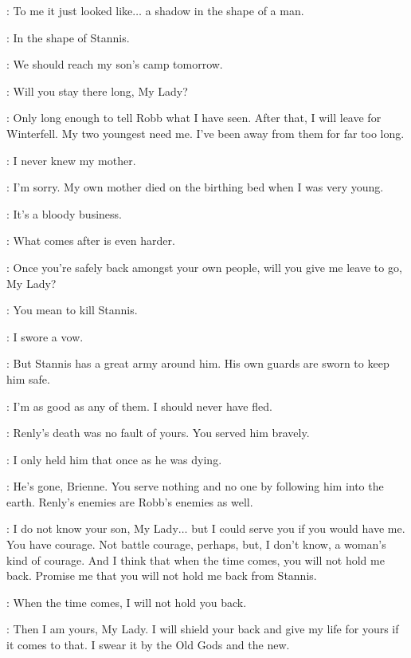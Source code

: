 \CATELYN: To me it just looked like$\ldots$ a shadow in the shape of a man. 

\BRIENNE: In the shape of Stannis. 

\CATELYN: We should reach my son's camp tomorrow. 

\BRIENNE: Will you stay there long, My Lady? 

\CATELYN: Only long enough to tell Robb what I have seen. After that, I will leave for Winterfell. My two youngest need me. I've been away from them for far too long. 

\BRIENNE: I never knew my mother. 

\CATELYN: I'm sorry. My own mother died on the birthing bed when I was very young. 

\BRIENNE: It's a bloody business. 

\CATELYN: What comes after is even harder. 

\BRIENNE: Once you're safely back amongst your own people, will you give me leave to go, My Lady? 

\CATELYN: You mean to kill Stannis. 

\BRIENNE: I swore a vow. 

\CATELYN: But Stannis has a great army around him. His own guards are sworn to keep him safe. 

\BRIENNE: I'm as good as any of them. I should never have fled. 

\CATELYN: Renly's death was no fault of yours. You served him bravely. 

\BRIENNE: I only held him that once as he was dying. 

\CATELYN: He's gone, Brienne. You serve nothing and no one by following him into the earth. Renly's enemies are Robb's enemies as well. 

\BRIENNE: I do not know your son, My Lady$\ldots$ but I could serve you if you would have me. You have courage. Not battle courage, perhaps, but, I don't know, a woman's kind of courage. And I think that when the time comes, you will not hold me back. Promise me that you will not hold me back from Stannis. 

\CATELYN: When the time comes, I will not hold you back. 


\BRIENNE: Then I am yours, My Lady. I will shield your back and give my life for yours if it comes to that. I swear it by the Old Gods and the new. 


